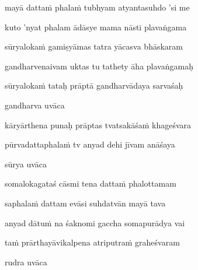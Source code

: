 mayā datta\.m phala\.m tubhyam atyantasuhdo 'si me \veg\dontdisplaylinenum

kuto 'nyat phalam ādāsye mama nāsti plavaṅgama\thinspace{\dandab} \dontdisplaylinenum

sūryaloka\.m gamiṣyāmas tatra yācasva bhāskaram \veg\dontdisplaylinenum

gandharvenaivam uktas tu tathety āha plavaṅgamaḥ\thinspace{\dandab} \dontdisplaylinenum

sūryaloka\.m tataḥ prāptā gandharvādaya sarvaśaḥ \veg\dontdisplaylinenum

gandharva uvāca~{\dandab}\dontdisplaylinenum 

kāryārthena punaḥ prāptas tvatsakāśa\.m khageśvara\thinspace{\danda} \dontdisplaylinenum

pūrvadattaphala\.m tv anyad dehi jīvam anāśaya \veg\dontdisplaylinenum

sūrya uvāca~{\dandab}\dontdisplaylinenum 

somalokagataś cāsmi tena datta\.m phalottamam\thinspace{\danda} \dontdisplaylinenum

saphala\.m dattam evāsi suhdatvān mayā tava \veg\dontdisplaylinenum

anyad dātu\.m na śaknomi gaccha somapurādya vai\thinspace{\dandab} \dontdisplaylinenum

ta\.m prārthayāvikalpena atriputra\.m graheśvaram \veg\dontdisplaylinenum

rudra uvāca~{\dandab}\dontdisplaylinenum 

